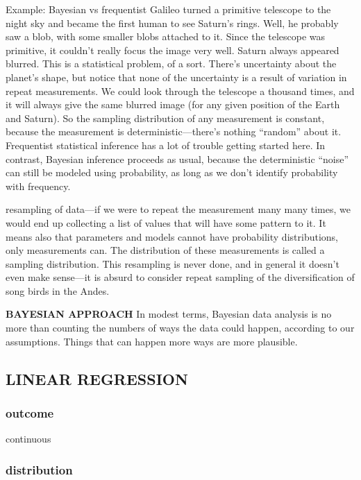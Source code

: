 \documentclass[
]{article}
\begin{document}
Example: Bayesian vs frequentist Galileo turned a primitive telescope to
the night sky and became the first human to see Saturn's rings. Well, he
probably saw a blob, with some smaller blobs attached to it. Since the
telescope was primitive, it couldn't really focus the image very well.
Saturn always appeared blurred. This is a statistical problem, of a
sort. There's uncertainty about the planet's shape, but notice that none
of the uncertainty is a result of variation in repeat measurements. We
could look through the telescope a thousand times, and it will always
give the same blurred image (for any given position of the Earth and
Saturn). So the sampling distribution of any measurement is constant,
because the measurement is deterministic---there's nothing ``random''
about it. Frequentist statistical inference has a lot of trouble getting
started here. In contrast, Bayesian inference proceeds as usual, because
the deterministic ``noise'' can still be modeled using probability, as
long as we don't identify probability with frequency.

resampling of data---if we were to repeat the measurement many many
times, we would end up collecting a list of values that will have some
pattern to it. It means also that parameters and models cannot have
probability distributions, only measurements can. The distribution of
these measurements is called a sampling distribution. This resampling is
never done, and in general it doesn't even make sense---it is absurd to
consider repeat sampling of the diversification of song birds in the
Andes.

\textbf{BAYESIAN APPROACH} In modest terms, Bayesian data analysis is no
more than counting the numbers of ways the data could happen, according
to our assumptions. Things that can happen more ways are more plausible.

\hypertarget{linear-regression}{%
\subsection{LINEAR REGRESSION}\label{linear-regression}}

\hypertarget{outcome}{%
\subsubsection{outcome}\label{outcome}}

continuous

\hypertarget{distribution}{%
\subsubsection{distribution}\label{distribution}}
\end{document}
